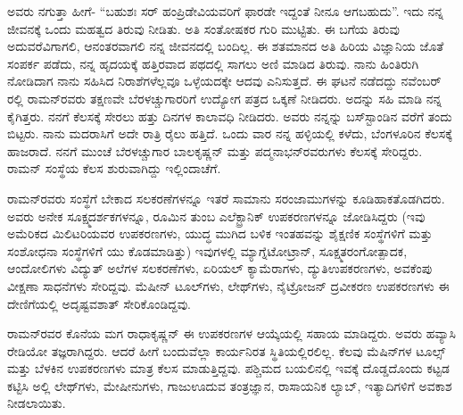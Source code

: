 ಅವರು ನಗುತ್ತಾ ಹೀಗೆ- “ಬಹುಶಃ ಸರ್ ಹಂಪ್ರಿಡೇವಿಯವರಿಗೆ ಫಾರಡೇ ಇದ್ದಂತೆ ನೀನೂ ಆಗಬಹುದು”. ಇದು ನನ್ನ ಜೀವನಕ್ಕೆ ಒಂದು ಮಹತ್ವದ ತಿರುವು ನೀಡಿತು. ಅತಿ ಸಂತೋಷಕರ ಗುರಿ ಮುಟ್ಟಿತು. ಈ ಬಗೆಯ ತಿರುವು ಅದುವರೆವಿಗಾಗಲಿ, ಆನಂತರವಾಗಲಿ ನನ್ನ ಜೀವನದಲ್ಲಿ ಬಂದಿಲ್ಲ. ಈ ಶತಮಾನದ ಅತಿ ಹಿರಿಯ ವಿಜ್ಞಾನಿಯ ಜೊತೆ ಸಂಪರ್ಕ ಪಡೆದು, ನನ್ನ ಹೃದಯಕ್ಕೆ ಹತ್ತಿರವಾದ ಪಥದಲ್ಲಿ ಸಾಗಲು ಅಣಿ ಮಾಡಿದ ತಿರುವು. ನಾನು ಹಿಂತಿರುಗಿ ನೋಡಿದಾಗ ನಾನು ಸಹಿಸಿದ ನಿರಾಶೆಗಳೆಲ್ಲವೂ ಒಳ್ಳೆಯದಕ್ಕೇ ಆದವು ಎನಿಸುತ್ತದೆ. ಈ ಘಟನೆ ನಡೆದದ್ದು ನವೆಂಬರ್ ರಲ್ಲಿ ರಾಮನ್‍ರವರು ತಕ್ಷಣವೇ ಬೆರಳಚ್ಚುಗಾರರಿಗೆ ಉದ್ಯೋಗ ಪತ್ರದ ಒಕ್ಕಣೆ ನೀಡಿದರು. ಅದನ್ನು ಸಹಿ ಮಾಡಿ ನನ್ನ ಕೈಗಿತ್ತರು. ನನಗೆ ಕೆಲಸಕ್ಕೆ ಸೇರಲು ಹತ್ತು ದಿನಗಳ ಕಾಲಾವಧಿ ನೀಡಿದರು. ಅವರು ನನ್ನನ್ನು ಬಸ್‍ಸ್ಟಾಂಡಿನ ವರೆಗೆ ತಂದು ಬಿಟ್ಟರು. ನಾನು ಮದರಾಸಿಗೆ ಅದೇ ರಾತ್ರಿ ರೈಲು ಹತ್ತಿದೆ. ಒಂದು ವಾರ ನನ್ನ ಹಳ್ಳಿಯಲ್ಲಿ ಕಳೆದು, ಬೆಂಗಳೂರಿನ ಕೆಲಸಕ್ಕೆ ಹಾಜರಾದೆ. ನನಗೆ ಮುಂಚೆ ಬೆರಳಚ್ಚುಗಾರ ಬಾಲಕೃಷ್ಣನ್ ಮತ್ತು ಪದ್ಮನಾಭನ್‍ರವರುಗಳು ಕೆಲಸಕ್ಕೆ ಸೇರಿದ್ದರು. ರಾಮನ್ ಸಂಸ್ಥೆಯ ಕೆಲಸ ಶುರುವಾಗಿದ್ದು ಇಲ್ಲಿಂದಾಚೆಗೆ.

ರಾಮನ್‍ರವರು ಸಂಸ್ಥೆಗೆ ಬೇಕಾದ ಸಲಕರಣೆಗಳನ್ನೂ ಇತರೆ ಸಾಮಾನು ಸರಂಜಾಮುಗಳನ್ನು ಕೂಡಿಹಾಕತೊಡಗಿದರು. ಅವರು ಅನೇಕ ಸೂಕ್ಷ್ಮದರ್ಶಕಗಳನ್ನೂ, ರೂಮಿನ ತುಂಬ ಎಲೆಕ್ಟ್ರಾನಿಕ್ ಉಪಕರಣಗಳನ್ನೂ ಜೋಡಿಸಿದ್ದರು (ಇವು ಅಮೆರಿಕದ ಮಿಲಿಟರಿಯವರ ಉಪಕರಣಗಳು, ಯುದ್ಧ ಮುಗಿದ ಬಳಿಕ ಇಂತಹವನ್ನು ಶೈಕ್ಷಣಿಕ ಸಂಸ್ಥೆಗಳಿಗೆ ಮತ್ತು ಸಂಶೋಧನಾ ಸಂಸ್ಥೆಗಳಿಗೆ ಯು ಕೊಡಮಾಡಿತ್ತು) ಇವುಗಳಲ್ಲಿ ಮ್ಯಾಗ್ನೆಟೋಟ್ರಾನ್, ಸೂಕ್ಷ್ಮತರಂಗೋತ್ಪಾದಕ, ಆಂದೋಲಿಗಳು ವಿದ್ಯುತ್ ಅಲೆಗಳ ಸಲಕರಣೆಗಳು, ಏರಿಯಲ್ ಕ್ಯಾಮೆರಾಗಳು, ದ್ಯುತಿಉಪಕರಣಗಳು, ಅವಕೆಂಪು ವೀಕ್ಷಣಾ ಸಾಧನೆಗಳು ಸೇರಿದ್ದವು. ಮೆಷೀನ್ ಟೂಲ್‍ಗಳು, ಲೇಥ್‍ಗಳು, ನೈಟ್ರೋಜನ್ ದ್ರವೀಕರಣ ಉಪಕರಣಗಳು ಈ ದೇಣಿಗೆಯಲ್ಲಿ ಅದೃಷ್ಟವಶಾತ್ ಸೇರಿಕೊಂಡಿದ್ದವು.

ರಾಮನ್‍ರವರ ಕೊನೆಯ ಮಗ ರಾಧಾಕೃಷ್ಣನ್ ಈ ಉಪಕರಣಗಳ ಆಯ್ಕೆಯಲ್ಲಿ ಸಹಾಯ ಮಾಡಿದ್ದರು. ಅವರು ಹವ್ಯಾಸಿ ರೇಡಿಯೋ ತಜ್ಞರಾಗಿದ್ದರು. ಆದರೆ ಹೀಗೆ ಬಂದುವೆಲ್ಲಾ ಕಾರ್ಯನಿರತ ಸ್ಥಿತಿಯಲ್ಲಿರಲಿಲ್ಲ. ಕೆಲವು ಮೆಷಿನ್‍ಗಳ ಟೂಲ್ಸ್ ಮತ್ತು ಬೆಳಕಿನ ಉಪಕರಣಗಳು ಮಾತ್ರ ಕೆಲಸ ಮಾಡುತ್ತಿದ್ದವು. ಪಶ್ಚಿಮದ ಬಯಲಿನಲ್ಲಿ ಇವಕ್ಕೆ ದೊಡ್ಡದೊಂದು ಕಟ್ಟಡ ಕಟ್ಟಿಸಿ ಅಲ್ಲಿ ಲೇಥ್‍ಗಳು, ಮೇಷೀನುಗಳು, ಗಾಜುಊದುವ ತಂತ್ರಜ್ಞಾನ, ರಾಸಾಯನಿಕ ಲ್ಯಾಬ್, ಇತ್ಯಾದಿಗಳಿಗೆ ಅವಕಾಶ ನೀಡಲಾಯಿತು.

